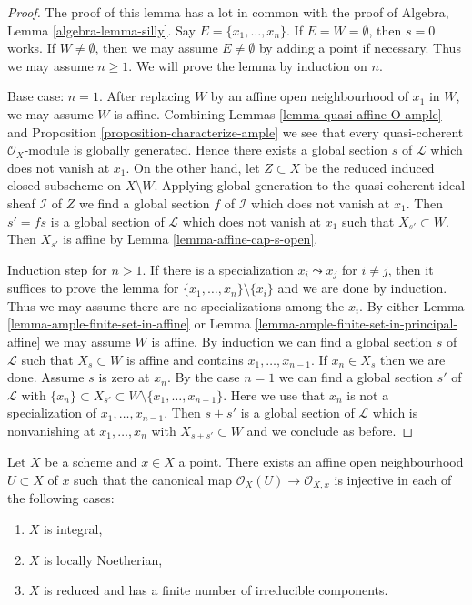 \begin{proof}
The proof of this lemma has a lot in common with the proof of
Algebra, Lemma \ref{algebra-lemma-silly}.
Say $E = \{x_1, \ldots, x_n\}$. If $E = W = \emptyset$, then $s = 0$
works. If $W \not = \emptyset$, then we may assume $E \not = \emptyset$
by adding a point if necessary. Thus we may assume $n \geq 1$.
We will prove the lemma by induction on $n$.

\medskip\noindent
Base case: $n = 1$. After replacing $W$ by an affine open neighbourhood
of $x_1$ in $W$, we may assume $W$ is affine. Combining
Lemmas \ref{lemma-quasi-affine-O-ample} and
Proposition \ref{proposition-characterize-ample}
we see that every quasi-coherent
$\mathcal{O}_X$-module is globally generated.
Hence there exists
a global section $s$ of $\mathcal{L}$ which does not vanish at $x_1$.
On the other hand, let $Z \subset X$ be the
reduced induced closed subscheme on $X \setminus W$.
Applying global generation to the quasi-coherent ideal sheaf
$\mathcal{I}$ of $Z$ we find a global section $f$ of $\mathcal{I}$
which does not vanish at $x_1$. Then $s' = fs$ is a global section
of $\mathcal{L}$ which does not vanish at $x_1$ such that
$X_{s'} \subset W$. Then $X_{s'}$ is affine by
Lemma \ref{lemma-affine-cap-s-open}.

\medskip\noindent
Induction step for $n > 1$. If there is a specialization
$x_i \leadsto x_j$ for $i \not = j$, then it suffices
to prove the lemma for $\{x_1, \ldots, x_n\} \setminus \{x_i\}$
and we are done by induction. Thus we may assume there are no
specializations among the $x_i$.
By either Lemma \ref{lemma-ample-finite-set-in-affine} or
Lemma \ref{lemma-ample-finite-set-in-principal-affine}
we may assume $W$ is affine.
By induction we can find a global section
$s$ of $\mathcal{L}$ such that $X_s \subset W$ is affine and contains
$x_1, \ldots, x_{n - 1}$. If $x_n \in X_s$ then we are done.
Assume $s$ is zero at $x_n$. By the case $n = 1$ we can find
a global section $s'$ of $\mathcal{L}$ with
$\{x_n\} \subset X_{s'} \subset
W \setminus \overline{\{x_1, \ldots, x_{n - 1}\}}$.
Here we use that $x_n$ is not a specialization of $x_1, \ldots, x_{n - 1}$.
Then $s + s'$
is a global section of $\mathcal{L}$ which is nonvanishing
at $x_1, \ldots, x_n$ with $X_{s + s'} \subset W$ and
we conclude as before.
\end{proof}

\begin{lemma}
\label{lemma-ring-affine-open-injective-local-ring}
Let $X$ be a scheme and $x \in X$ a point. There exists an affine open
neighbourhood $U \subset X$ of $x$ such that the canonical map
$\mathcal{O}_X(U) \to \mathcal{O}_{X, x}$ is injective in each of
the following cases:
\begin{enumerate}
\item $X$ is integral,
\item $X$ is locally Noetherian,
\item $X$ is reduced and has a finite number of irreducible components.
\end{enumerate}
\end{lemma}

